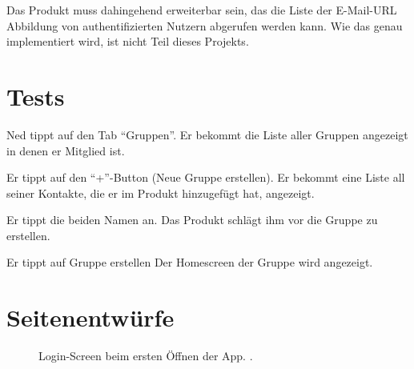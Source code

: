 \documentclass[parskip=full,11pt]{scrartcl}
\begin{document}
Das Produkt muss dahingehend erweiterbar sein,
das die Liste der E-Mail-URL Abbildung von authentifizierten Nutzern
abgerufen werden kann.
Wie das genau implementiert wird, ist nicht Teil dieses Projekts.

\section{Tests}


{Ned tippt auf den Tab  \enquote{Gruppen}.}
{Er bekommt die Liste aller Gruppen angezeigt in denen er Mitglied ist.}

{Er tippt auf den \enquote{+}-Button (Neue Gruppe erstellen).}
{Er bekommt eine Liste all seiner Kontakte, die er im Produkt hinzugefügt hat, angezeigt.}

{Er tippt die beiden Namen an.}
{Das Produkt schlägt ihm vor die Gruppe zu erstellen.}

{Er tippt auf Gruppe erstellen}
{Der Homescreen der Gruppe wird angezeigt.} %

\pagebreak
\appendix

\section{Seitenentwürfe}


\begin{figure}[hb]
	\caption{\label{fig:menu}
		Login-Screen beim ersten Öffnen der App.
		 .
	}
\end{figure}
\end{document}
